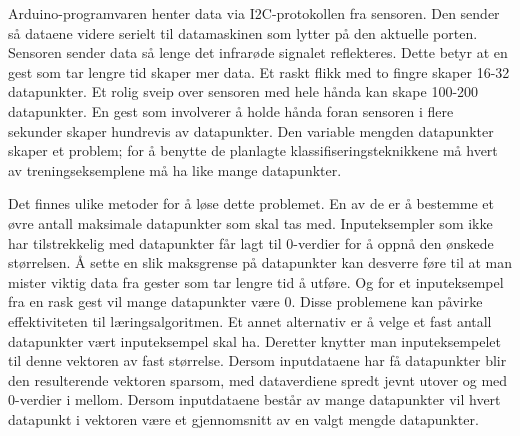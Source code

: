 Arduino-programvaren henter data via I2C-protokollen fra sensoren. Den sender så dataene videre serielt til datamaskinen som lytter på den aktuelle porten. Sensoren sender data så lenge det infrarøde signalet reflekteres. Dette betyr at en gest som tar lengre tid skaper mer data. Et raskt flikk med to fingre skaper 16-32 datapunkter. Et rolig sveip over sensoren med hele hånda kan skape 100-200 datapunkter. En gest som involverer å holde hånda foran sensoren i flere sekunder skaper hundrevis av datapunkter. Den variable mengden datapunkter skaper et problem; for å benytte de planlagte klassifiseringsteknikkene må hvert av treningseksemplene må ha like mange datapunkter.

Det finnes ulike metoder for å løse dette problemet. En av de er å bestemme et øvre antall maksimale datapunkter som skal tas med. Inputeksempler som ikke har tilstrekkelig med datapunkter får lagt til 0-verdier for å oppnå den ønskede størrelsen. Å sette en slik maksgrense på datapunkter kan desverre føre til at man mister viktig data fra gester som tar lengre tid å utføre. Og for et inputeksempel fra en rask gest vil mange datapunkter være 0. Disse problemene kan påvirke effektiviteten til læringsalgoritmen. Et annet alternativ er å velge et fast antall datapunkter vært inputeksempel skal ha. Deretter knytter man inputeksempelet til denne vektoren av fast størrelse. Dersom inputdataene har få datapunkter blir den resulterende vektoren sparsom, med dataverdiene spredt jevnt utover og med 0-verdier i mellom. Dersom inputdataene består av mange datapunkter vil hvert datapunkt i vektoren være et gjennomsnitt av en valgt mengde datapunkter.

